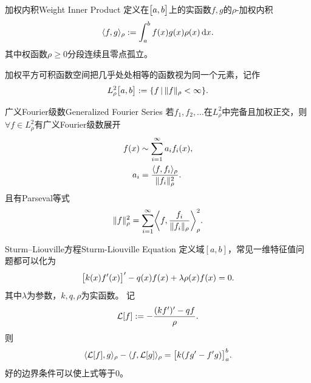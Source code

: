 \begin{definition}{加权内积}{Weight Inner Product}
	定义在$\bigl[a,b\bigr]$上的实函数$f,g$的$\rho$\;-\;加权内积
	\begin{equation}
		\label{eq:mmp-weighted-inner-product}
		\langle f,g\rangle_\rho := \int_a^bf(x)g(x)\rho(x)\mathop{}\!\mathrm{d} x.
	\end{equation}
	其中权函数$\rho \geqslant 0$分段连续且零点孤立。

	加权平方可积函数空间把几乎处处相等的函数视为同一个元素，记作
	\begin{equation}
		\label{eq:mmp-weighted-square-integrable}
		L^2_\rho\bigl[a,b\bigr] := \{f\,\vert\,\lVert f\rVert_\rho < \infty\}.
	\end{equation}
\end{definition}
\begin{theorem}{广义Fourier级数}{Generalized Fourier Series}
	若$f_1,f_2,\ldots$在$L^2_\rho$中完备且加权正交，则$\forall f \in L^2_\rho$有广义Fourier级数展开
	\begin{subequations}
		\label{eq:mmp-generalized-fourier-expansion}
		\begin{align}
			f(x) &\sim \sum_{i=1}^\infty a_if_i(x),\\
			a_i &= \frac{\langle f,f_i\rangle_\rho}{\lVert f_i\rVert^2_\rho}.
		\end{align}
	\end{subequations}
	且有Parseval等式
	\begin{equation}
		\label{eq:mmp-generalized-parseval}
		\lVert f\rVert_\rho^2 = \sum_{i=1}^\infty\biggl\langle f,\frac{f_i}{\lVert f_i\rVert_\rho}\biggr\rangle_\rho^2.
	\end{equation}
\end{theorem}
\begin{definition}{Sturm--Liouville方程}{Sturm-Liouville Equation}
	定义域$[a,b]$，常见一维特征值问题都可以化为
	\begin{equation}
		\label{eq:mmp-sturm-liouville-ode}
		\bigl[k(x)f'(x)\bigr]' - q(x)f(x) + \lambda\rho(x)f(x) = 0.
	\end{equation}
	其中$\lambda$为参数，$k,q,\rho$为实函数。
	记
	\begin{equation}
		\label{eq:mmp-sturm-liouville-operator}
		\operatorname{\mathcal L}[f] := -\frac{(kf')' - qf}\rho.
	\end{equation}
	则
	\begin{equation}
		\label{eq:mmp-sturm-liouville-lagrange-identity}
		\langle\operatorname{\mathcal L}[f],g\rangle_\rho - \langle f,\operatorname{\mathcal L}[g]\rangle_\rho = \bigl[k(fg' - f'g)\bigr]_a^b.
	\end{equation}
	好的边界条件可以使上式等于0。
\end{definition}
